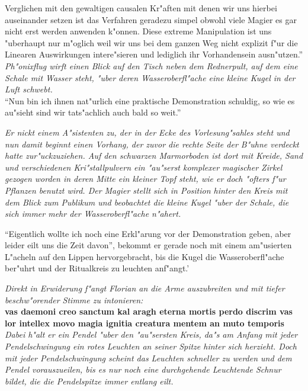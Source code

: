 \documentclass[a5paper,8pt]{book}
\begin{document}
Verglichen mit den gewaltigen causalen Kr"aften mit denen wir uns hierbei auseinander setzen ist das Verfahren geradezu simpel obwohl viele Magier es gar nicht erst werden 
anwenden k"onnen. Diese extreme Manipulation ist uns "uberhaupt nur m"oglich weil wir uns bei dem ganzen Weg nicht explizit f"ur die Linearen Auswirkungen intere"sieren und 
lediglich ihr Vorhandensein ausn"utzen.''\\

\textit{Ph"onixflug wirft einen Blick auf den Tisch neben dem Rednerpult, auf dem eine Schale mit Wasser steht, "uber deren Wasseroberfl"ache eine kleine Kugel in der Luft 
schwebt.}\\

``Nun bin ich ihnen nat"urlich eine praktische Demonstration schuldig, so wie es au"sieht sind wir tats"achlich auch bald so weit.''

\textit{Er nickt einem A"sistenten zu, der in der Ecke des Vorlesung"sahles steht und nun damit beginnt einen Vorhang, der zuvor die rechte Seite der B"uhne verdeckt hatte 
zur"uckzuziehen. Auf den schwarzen Marmorboden ist dort mit Kreide, Sand und verschiedenen Kri"stallpulvern ein "au"serst komplexer magischer Zirkel gezogen worden in deren 
Mitte ein kleiner Topf steht, wie er doch "ofters f"ur Pflanzen benutzt wird.
Der Magier stellt sich in Position hinter den Kreis mit dem Blick zum Publikum und beobachtet die kleine Kugel "uber der Schale, die sich immer mehr der Wasseroberfl"ache 
n"ahert.}\

``Eigentlich wollte ich noch eine Erkl"arung vor der Demonstration geben, aber leider eilt uns die Zeit davon'', bekommt er gerade noch mit einem am"usierten L"acheln auf den 
Lippen hervorgebracht, bis die Kugel die Wasseroberfl"ache ber"uhrt und der Ritualkreis zu leuchten anf"angt.'

\textit{Direkt in Erwiderung f"angt Florian an die Arme auszubreiten und mit tiefer beschw"orender Stimme zu intonieren:}\\

\textbf{vas daemoni creo sanctum kal aragh eterna mortis perdo discrim vas lor intellex movo magia ignitia creatura mentem an muto temporis}\\

\textit{Dabei h"alt er ein Pendel "uber den "au"sersten Kreis, da"s am Anfang mit jeder Pendelschwingung ein rotes Leuchten an seiner Spitze hinter sich herzieht. Doch mit jeder 
Pendelschwingung scheint das Leuchten schneller zu werden und dem Pendel vorauszueilen, bis es nur noch eine durchgehende Leuchtende Schnur bildet, die die Pendelspitze 
immer entlang eilt.}\\
\end{document}
